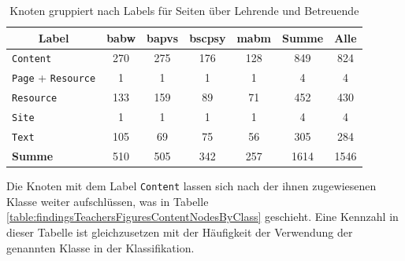     \begin{table}[htb]
        \centering
        \begin{tabular}{|l|c|c|c|c|c|c|}
            \hline
            \multicolumn{1}{|c|}{\textbf{Label}} & \textbf{\gls{babw}} & \textbf{\gls{bapvs}} & \textbf{\gls{bscpsy}} & \textbf{\gls{mabm}} & \textbf{Summe} & \textbf{Alle} \\ \hline
            \texttt{Content}                                     & 270           & 275            & 176             & 128           & 849            & 824           \\ \hline
            \texttt{Page} + \texttt{Resource}                             & 1             & 1              & 1               & 1             & 4              & 4             \\ \hline
            \texttt{Resource}                                    & 133           & 159            & 89              & 71            & 452            & 430           \\ \hline
            \texttt{Site}                                        & 1             & 1              & 1               & 1             & 4              & 4             \\ \hline
            \texttt{Text}                                        & 105           & 69             & 75              & 56            & 305            & 284           \\ \hline
            \hline
            \textbf{Summe}                              & 510           & 505            & 342             & 257           & 1614           & 1546          \\ \hline
        \end{tabular}
        \caption{Knoten gruppiert nach Labels für Seiten über Lehrende und Betreuende}
        \label{table:findingsTeachersFiguresNodesByLabel}
    \end{table}

    Die Knoten mit dem Label \texttt{Content} lassen sich nach der ihnen zugewiesenen Klasse
    weiter aufschlüssen, was in Tabelle \ref{table:findingsTeachersFiguresContentNodesByClass} geschieht.
    Eine Kennzahl in dieser Tabelle ist gleichzusetzen mit der Häufigkeit der Verwendung
    der genannten Klasse in der Klassifikation.

